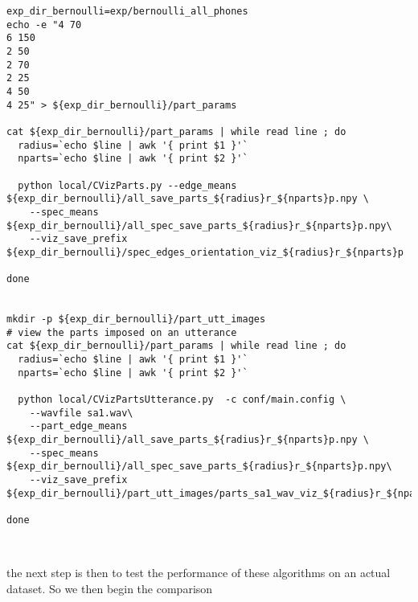 \documentclass{article}
\begin{document}
\begin{verbatim}
exp_dir_bernoulli=exp/bernoulli_all_phones
echo -e "4 70
6 150
2 50
2 70
2 25
4 50
4 25" > ${exp_dir_bernoulli}/part_params 

cat ${exp_dir_bernoulli}/part_params | while read line ; do
  radius=`echo $line | awk '{ print $1 }'`
  nparts=`echo $line | awk '{ print $2 }'`

  python local/CVizParts.py --edge_means ${exp_dir_bernoulli}/all_save_parts_${radius}r_${nparts}p.npy \
    --spec_means ${exp_dir_bernoulli}/all_spec_save_parts_${radius}r_${nparts}p.npy\
    --viz_save_prefix ${exp_dir_bernoulli}/spec_edges_orientation_viz_${radius}r_${nparts}p

done


mkdir -p ${exp_dir_bernoulli}/part_utt_images
# view the parts imposed on an utterance
cat ${exp_dir_bernoulli}/part_params | while read line ; do
  radius=`echo $line | awk '{ print $1 }'`
  nparts=`echo $line | awk '{ print $2 }'`

  python local/CVizPartsUtterance.py  -c conf/main.config \
    --wavfile sa1.wav\
    --part_edge_means ${exp_dir_bernoulli}/all_save_parts_${radius}r_${nparts}p.npy \
    --spec_means ${exp_dir_bernoulli}/all_spec_save_parts_${radius}r_${nparts}p.npy\
    --viz_save_prefix ${exp_dir_bernoulli}/part_utt_images/parts_sa1_wav_viz_${radius}r_${nparts}p

done



\end{verbatim}
the next step is then to test the performance
of these algorithms on an actual dataset. So we then begin
the comparison
\end{document}
